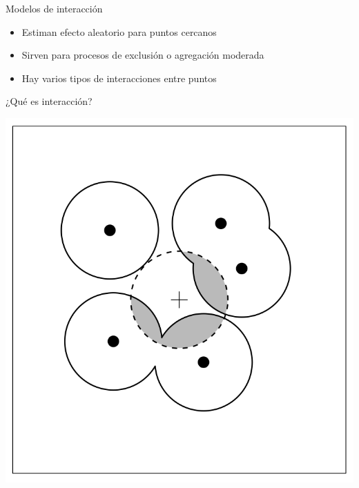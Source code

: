 \documentclass[
  11pt,
  ignorenonframetext,
]{beamer}
\providecommand{\tightlist}{%
  \setlength{\itemsep}{0pt}\setlength{\parskip}{0pt}}
\begin{document}
\begin{frame}{Modelos de interacción}
\protect\hypertarget{modelos-de-interacciuxf3n}{}
\begin{itemize}
\tightlist
\item
  Estiman efecto aleatorio para puntos cercanos
\item
  Sirven para procesos de exclusión o agregación moderada
\item
  Hay varios tipos de interacciones entre puntos
\end{itemize}
\end{frame}

\begin{frame}{¿Qué es interacción?}
\protect\hypertarget{quuxe9-es-interacciuxf3n}{}
\begin{center}\includegraphics[width=10.31in]{Figuras/Interaccion-puntos} \end{center}
\end{frame}
\end{document}
